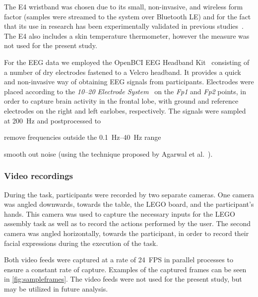The E4 wristband was chosen due to its small, non-invasive, and wireless form factor (samples were streamed to the system over Bluetooth LE) and for the fact that its use in research has been experimentally validated in previous studies~\cite{ragot2017emotion, mccarthy2016validation}.
The E4 also includes a skin temperature thermometer, however the measure was not used for the present study.

For the EEG data we employed the OpenBCI EEG Headband Kit~\cite{openbci:headbandkit} consisting of a number of dry electrodes fastened to a Velcro headband.
It provides a quick and non-invasive way of obtaining EEG signals from participants.
Electrodes were placed according to the \emph{10--20 Electrode System}~\cite{eeg1020system:1961} on the \emph{Fp1} and \emph{Fp2} points, in order to capture brain activity in the frontal lobe, with ground and reference electrodes on the right and left earlobes, respectively.
The signals were sampled at \SI{200}{\hertz} and postprocessed to 
\begin{enumerate*}[itemjoin={{, }},
                  itemjoin*={{, and }},
                  label={{(\arabic*)}}]
  \item remove frequencies outside the \SIrange{0.1}{40}{\hertz} range
  \item smooth out noise (using the technique proposed by Agarwal et al.~\cite{agarwal2017eeg}).
\end{enumerate*}

\subsubsection{Video recordings}

During the task, participants were recorded by two separate cameras.
One camera was angled downwards, towards the table, the LEGO board, and the participant's hands.
This camera was used to capture the necessary inputs for the LEGO assembly task as well as to record the actions performed by the user.
The second camera was angled horizontally, towards the participant, in order to record their facial expressions during the execution of the task.

Both video feeds were captured at a rate of \num{24}~FPS in parallel processes to ensure a constant rate of capture.
Examples of the captured frames can be seen in \cref{fig:sampleframes}.
The video feeds were not used for the present study, but may be utilized in future analysis.

